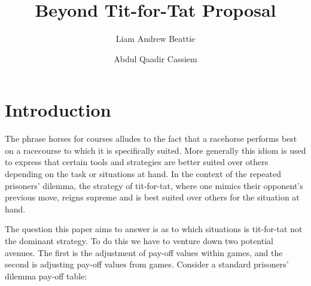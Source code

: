 \documentclass[11pt,preprint]{elsarticle}
\numberwithin{equation}{section}
\numberwithin{figure}{section}
\numberwithin{table}{section}
\begin{document}
\begin{frontmatter}  %

\title{Beyond Tit-for-Tat Proposal}





\author[Add1]{Liam Andrew Beattie}

\author[Add1]{Abdul Qaadir Cassiem}




\address[Add1]{Microeconomics 871, Stellenbosch University, South
Africa}



\vspace{1cm}





\vspace{0.5cm}

\end{frontmatter}

\setcounter{footnote}{0}



\pagestyle{fancy}
\chead{}
\rhead{}
\lfoot{}
\lhead{}
\cfoot{}


\headsep 35pt %




\section{\texorpdfstring{Introduction
\label{Introduction}}{Introduction }}\label{introduction}

The phrase horses for courses alludes to the fact that a racehorse
performs best on a racecourse to which it is specifically suited. More
generally this idiom is used to express that certain tools and
strategies are better suited over others depending on the task or
situations at hand. In the context of the repeated prisoners' dilemma,
the strategy of tit-for-tat, where one mimics their opponent's previous
move, reigns supreme and is best suited over others for the situation at
hand.

The question this paper aims to answer is as to which situations is
tit-for-tat not the dominant strategy. To do this we have to venture
down two potential avenues. The first is the adjustment of pay-off
values within games, and the second is adjusting pay-off values from
games. Consider a standard prisoners' dilemma pay-off table:
\end{document}
